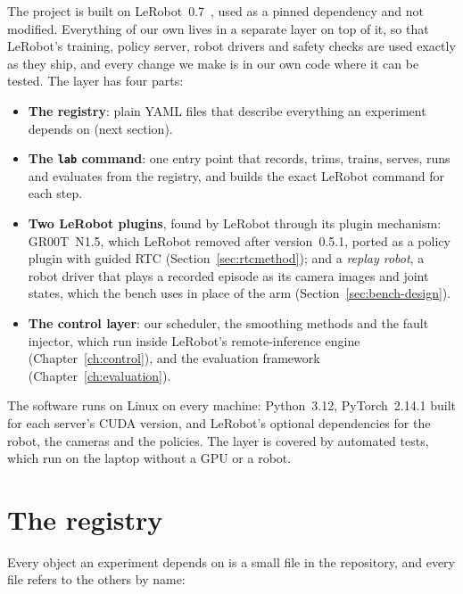 The project is built on LeRobot~0.7~\cite{lerobot}, used as a pinned dependency and not modified. Everything of our
own lives in a separate layer on top of it, so that LeRobot's training, policy server, robot drivers and safety checks
are used exactly as they ship, and every change we make is in our own code where it can be tested. The layer has
four parts:
\begin{itemize}
\item \textbf{The registry}: plain YAML files that describe everything an experiment depends on (next section).
\item \textbf{The \texttt{lab} command}: one entry point that records, trims, trains, serves, runs and evaluates from
      the registry, and builds the exact LeRobot command for each step.
\item \textbf{Two LeRobot plugins}, found by LeRobot through its plugin mechanism: GR00T~N1.5, which LeRobot removed
      after version~0.5.1, ported as a policy plugin with guided RTC (Section~\ref{sec:rtcmethod}); and a
      \emph{replay robot}, a robot driver that plays a recorded episode as its camera images and joint states, which
      the bench uses in place of the arm (Section~\ref{sec:bench-design}).
\item \textbf{The control layer}: our \drtc{} scheduler, the smoothing methods and the fault injector, which run inside
      LeRobot's remote-inference engine (Chapter~\ref{ch:control}), and the evaluation framework
      (Chapter~\ref{ch:evaluation}).
\end{itemize}
The software runs on Linux on every machine: Python~3.12, PyTorch~2.14.1 built for each server's CUDA version, and
LeRobot's optional dependencies for the robot, the cameras and the policies. The layer is covered by
 automated tests, which run on the laptop without a GPU or a robot.


\section{The registry}\label{sec:registry}

Every object an experiment depends on is a small file in the repository, and every file refers to the others by name:

